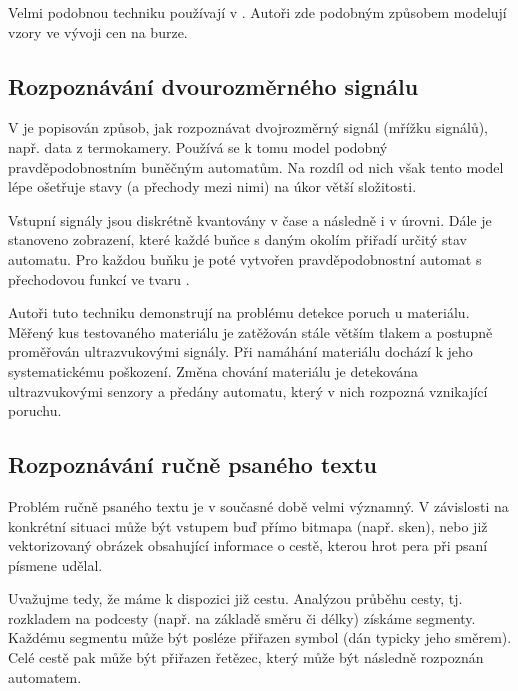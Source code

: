 \documentclass[a4paper,10pt]{article}
\begin{document}
Velmi podobnou techniku používají v \cite{ManPra-PriPatDetUsFiStMaFuzTra}. Autoři zde podobným způsobem modelují vzory ve vývoji cen na burze.

\subsection{Rozpoznávání dvourozměrného signálu}
V \cite{Jin+-WavBasFeaExtUsPrFiStAuPatCla} je popisován způsob, jak rozpoznávat dvojrozměrný signál (mřížku signálů), např. data z termokamery. Používá se k tomu model podobný pravděpodobnostním buněčným automatům. Na rozdíl od nich však tento model lépe ošetřuje stavy (a přechody mezi nimi) na úkor větší složitosti.

Vstupní signály jsou diskrétně kvantovány v čase a následně i v úrovni. Dále je stanoveno zobrazení, které každé buňce s daným okolím přiřadí určitý stav automatu. Pro každou buňku je poté vytvořen pravděpodobnostní automat s přechodovou funkcí ve tvaru .

Autoři tuto techniku demonstrují na problému detekce poruch u materiálu. Měřený kus testovaného materiálu je zatěžován stále větším tlakem a postupně proměřován ultrazvukovými signály. Při namáhání materiálu dochází k jeho systematickému poškození. Změna chování materiálu je detekována ultrazvukovými senzory a předány automatu, který v nich rozpozná vznikající poruchu.

\subsection{Rozpoznávání ručně psaného textu}
Problém ručně psaného textu je v současné době velmi významný. V závislosti na konkrétní situaci může být vstupem buď přímo bitmapa (např. sken), nebo již vektorizovaný obrázek obsahující informace o cestě, kterou hrot pera při psaní písmene udělal.

Uvažujme tedy, že máme k dispozici již cestu. Analýzou průběhu cesty, tj. rozkladem na podcesty (např. na základě směru či délky) získáme segmenty. Každému segmentu může být posléze přiřazen symbol (dán typicky jeho směrem). Celé cestě pak může být přiřazen řetězec, který může být následně rozpoznán automatem.
\end{document}
